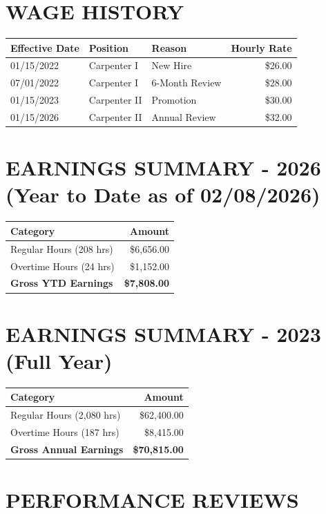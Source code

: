 \documentclass[11pt]{article}
\begin{document}
\section*{WAGE HISTORY}

\begin{tabular}{@{}lllr@{}}
\toprule
\textbf{Effective Date} & \textbf{Position} & \textbf{Reason} & \textbf{Hourly Rate} \\
\midrule
01/15/2022 & Carpenter I & New Hire & \$26.00 \\
07/01/2022 & Carpenter I & 6-Month Review & \$28.00 \\
01/15/2023 & Carpenter II & Promotion & \$30.00 \\
01/15/2026 & Carpenter II & Annual Review & \$32.00 \\
\bottomrule
\end{tabular}

\section*{EARNINGS SUMMARY - 2026 (Year to Date as of 02/08/2026)}

\begin{tabular}{@{}p{5cm}r@{}}
\toprule
\textbf{Category} & \textbf{Amount} \\
\midrule
Regular Hours (208 hrs) & \$6,656.00 \\
Overtime Hours (24 hrs) & \$1,152.00 \\
\midrule
\textbf{Gross YTD Earnings} & \textbf{\$7,808.00} \\
\bottomrule
\end{tabular}

\section*{EARNINGS SUMMARY - 2023 (Full Year)}

\begin{tabular}{@{}p{5cm}r@{}}
\toprule
\textbf{Category} & \textbf{Amount} \\
\midrule
Regular Hours (2,080 hrs) & \$62,400.00 \\
Overtime Hours (187 hrs) & \$8,415.00 \\
\midrule
\textbf{Gross Annual Earnings} & \textbf{\$70,815.00} \\
\bottomrule
\end{tabular}

\section*{PERFORMANCE REVIEWS}
\end{document}

